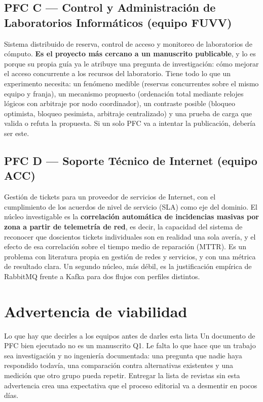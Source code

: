 \documentclass[11pt,a4paper]{article}
\begin{document}
\subsection{PFC C --- Control y Administración de Laboratorios Informáticos (equipo FUVV)}

Sistema distribuido de reserva, control de acceso y monitoreo de laboratorios de cómputo. \textbf{Es el proyecto más cercano a un manuscrito publicable}, y lo es porque su propia guía ya le atribuye una pregunta de investigación: cómo mejorar el acceso concurrente a los recursos del laboratorio. Tiene todo lo que un experimento necesita: un fenómeno medible (reservas concurrentes sobre el mismo equipo y franja), un mecanismo propuesto (ordenación total mediante relojes lógicos con arbitraje por nodo coordinador), un contraste posible (bloqueo optimista, bloqueo pesimista, arbitraje centralizado) y una prueba de carga que valida o refuta la propuesta. Si un solo PFC va a intentar la publicación, debería ser este.

\subsection{PFC D --- Soporte Técnico de Internet (equipo ACC)}

Gestión de tickets para un proveedor de servicios de Internet, con el cumplimiento de los acuerdos de nivel de servicio (SLA) como eje del dominio. El núcleo investigable es la \textbf{correlación automática de incidencias masivas por zona a partir de telemetría de red}, es decir, la capacidad del sistema de reconocer que doscientos tickets individuales son en realidad una sola avería, y el efecto de esa correlación sobre el tiempo medio de reparación (MTTR). Es un problema con literatura propia en gestión de redes y servicios, y con una métrica de resultado clara. Un segundo núcleo, más débil, es la justificación empírica de RabbitMQ frente a Kafka para dos flujos con perfiles distintos.

\section{Advertencia de viabilidad}
\label{sec:viabilidad}

\begin{alerta}{Lo que hay que decirles a los equipos antes de darles esta lista}
	Un documento de PFC bien ejecutado no es un manuscrito Q1. Le falta lo que hace que un trabajo sea investigación y no ingeniería documentada: una pregunta que nadie haya respondido todavía, una comparación contra alternativas existentes y una medición que otro grupo pueda repetir. Entregar la lista de revistas sin esta advertencia crea una expectativa que el proceso editorial va a desmentir en pocos días.
\end{alerta}
\end{document}
